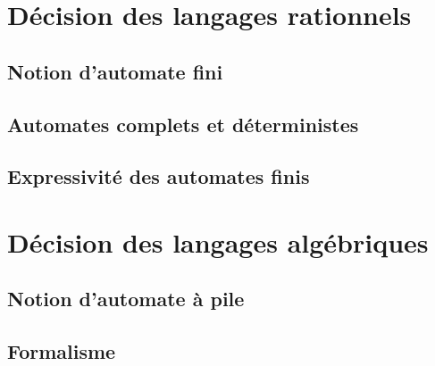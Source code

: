 \documentclass[9pt]{beamer}
\begin{document}
\section{Décision des langages rationnels}
 
\subsection{Notion d'automate fini}






 
\subsection{Automates complets et déterministes}




 
\subsection{Expressivité des automates finis}


 
\section{Décision des langages algébriques}
 
\subsection{Notion d'automate à pile}



 
\subsection{Formalisme}






 
\end{document}
